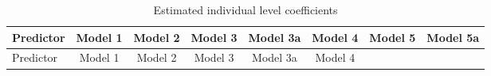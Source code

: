 \documentclass[12pt,twoside]{reedthesis}
\begin{document}
  \begin{longtable}[]{@{}lccccccc@{}}
  \caption{Estimated individual level coefficients
  \label{tab:model_indiv_coef}}\tabularnewline
  \toprule
  \begin{minipage}[b]{0.12\columnwidth}\raggedright\strut
  Predictor\strut
  \end{minipage} & \begin{minipage}[b]{0.09\columnwidth}\centering\strut
  Model 1\strut
  \end{minipage} & \begin{minipage}[b]{0.10\columnwidth}\centering\strut
  Model 2\strut
  \end{minipage} & \begin{minipage}[b]{0.10\columnwidth}\centering\strut
  Model 3\strut
  \end{minipage} & \begin{minipage}[b]{0.10\columnwidth}\centering\strut
  Model 3a\strut
  \end{minipage} & \begin{minipage}[b]{0.10\columnwidth}\centering\strut
  Model 4\strut
  \end{minipage} & \begin{minipage}[b]{0.10\columnwidth}\centering\strut
  Model 5\strut
  \end{minipage} & \begin{minipage}[b]{0.10\columnwidth}\centering\strut
  Model 5a\strut
  \end{minipage}\tabularnewline
  \midrule
  \endfirsthead
  \toprule
  \begin{minipage}[b]{0.12\columnwidth}\raggedright\strut
  Predictor\strut
  \end{minipage} & \begin{minipage}[b]{0.09\columnwidth}\centering\strut
  Model 1\strut
  \end{minipage} & \begin{minipage}[b]{0.10\columnwidth}\centering\strut
  Model 2\strut
  \end{minipage} & \begin{minipage}[b]{0.10\columnwidth}\centering\strut
  Model 3\strut
  \end{minipage} & \begin{minipage}[b]{0.10\columnwidth}\centering\strut
  Model 3a\strut
  \end{minipage} & \begin{minipage}[b]{0.10\columnwidth}\centering\strut
  Model 4\strut
  \end{minipage} & \begin{minipage}[b]{0.10\columnwidth}\centering\strut

\end{minipage}
\end{longtable}
\end{document}
